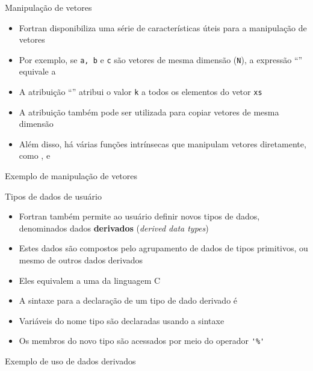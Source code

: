 \begin{frame}[fragile]{Manipulação de vetores}

    \begin{itemize}
        \item Fortran disponibiliza uma série de características úteis para a manipulação de
            vetores

        \item Por exemplo, se \texttt{a, b} e \texttt{c} são vetores de mesma dimensão 
            (\texttt{N}), a expressão ``'' equivale a


        \item A atribuição ``'' atribui o valor \texttt{k} a todos os 
            elementos do vetor \texttt{xs}

        \item A atribuição também pode ser utilizada para copiar vetores de mesma dimensão

        \item Além disso, há várias funções intrínsecas que manipulam vetores diretamente, como
            ,  e 
    \end{itemize}

\end{frame}

\begin{frame}[fragile]{Exemplo de manipulação de vetores}
\end{frame}

\begin{frame}[fragile]{Tipos de dados de usuário}

    \begin{itemize}
        \item Fortran também permite ao usuário definir novos tipos de dados, denominados
            dados \textbf{derivados} (\textit{derived data types})

        \item Estes dados são compostos pelo agrupamento de dados de tipos primitivos, ou mesmo
            de outros dados derivados

        \item Eles equivalem a uma  da linguagem C

        \item A sintaxe para a declaração de um tipo de dado derivado é


        \item Variáveis do nome tipo são declaradas usando a sintaxe


        \item Os membros do novo tipo são acessados por meio do operador \verb|'%'|
    \end{itemize}

\end{frame}

\begin{frame}[fragile]{Exemplo de uso de dados derivados}
\end{frame}
